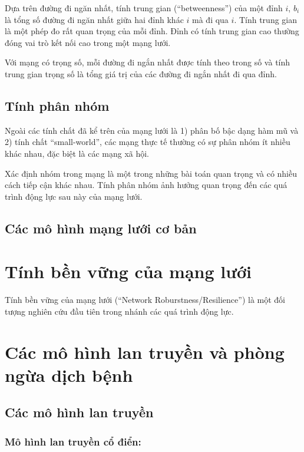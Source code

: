 \documentclass[]{book}
\begin{document}
Dựa trên đường đi ngăn nhất, tính trung gian (``betweenness'') của một
đỉnh \(i\), \(b_i\) là tổng số đường đi ngăn nhất giữa hai đỉnh khác
\(i\) mà đi qua \(i\). Tính trung gian là một phép đo rất quan trọng của
mỗi đỉnh. Đỉnh có tính trung gian cao thường đóng vai trò kết nối cao
trong một mạng lưới.

Với mạng có trọng số, mỗi đường đi ngắn nhất được tính theo trong số và
tính trung gian trọng số là tổng giá trị của các đường đi ngắn nhất đi
qua đỉnh.

\section{Tính phân nhóm}\label{tinh-phan-nhom}

Ngoài các tính chất đã kể trên của mạng lưới là 1) phân bố bậc dạng hàm
mũ và 2) tính chất ``small-world'', các mạng thực tế thường có sự phân
nhóm ít nhiều khác nhau, đặc biệt là các mạng xã hội.

Xác định nhóm trong mạng là một trong những bài toán quan trọng và có
nhiều cách tiếp cận khác nhau. Tính phân nhóm ảnh hưởng quan trọng đến
các quá trình động lực sau này của mạng lưới.

\section{Các mô hình mạng lưới cơ
bản}\label{cac-mo-hinh-mang-lui-co-ban}

\chapter{Tính bền vững của mạng lưới}\label{tinh-bn-vng-cua-mang-lui}

Tính bền vững của mạng lưới (``Network Roburstness/Resilience'') là một
đối tượng nghiên cứu đầu tiên trong nhánh các quá trình động lực.

\chapter{Các mô hình lan truyền và phòng ngừa dịch
bệnh}\label{cac-mo-hinh-lan-truyn-va-phong-nga-dich-bnh}

\section{Các mô hình lan truyền}\label{cac-mo-hinh-lan-truyn}

\subsection{Mô hình lan truyền cổ điển:}\label{mo-hinh-lan-truyn-c-in}
\end{document}

